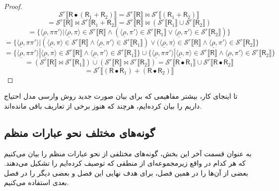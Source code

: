 \begin{proof}
	$$\mathcal{S}^r \llbracket \mathsf{R}\bullet (\mathsf{R}_1 + \mathsf{R}_2) \rrbracket =\mathcal{S}^r \llbracket \mathsf{R} \rrbracket \Join \mathcal{S}^r \llbracket (\mathsf{R}_1+\mathsf{R}_2) \rrbracket$$
	$$=\mathcal{S}^r \llbracket \mathsf{R} \rrbracket \Join \mathcal{S}^r \llbracket \mathsf{R}_1+\mathsf{R}_2 \rrbracket=\mathcal{S}^r \llbracket \mathsf{R} \rrbracket \Join (\mathcal{S}^r \llbracket \mathsf{R}_1 \rrbracket \cup \mathcal{S}^r\llbracket \mathsf{R}_2 \rrbracket)$$
	$$= \{ \langle \underline{\rho}, \pi \pi' \rangle| \langle \underline{\rho}, \pi \rangle \in \mathcal{S}^r \llbracket \mathsf{R} \rrbracket \land (\langle \underline{\rho},\pi'\rangle \in \mathcal{S}^r \llbracket \mathsf{R}_1 \rrbracket\lor \langle \underline{\rho} , \pi' \rangle \in \mathcal{S}^r \llbracket \mathsf{R}_2 \rrbracket) \}$$
	$$=\{ \langle \underline{\rho}, \pi \pi' \rangle| (\langle \underline{\rho}, \pi \rangle \in \mathcal{S}^r \llbracket \mathsf{R} \rrbracket \land \langle \underline{\rho},\pi'\rangle \in \mathcal{S}^r \llbracket \mathsf{R}_1 \rrbracket) \lor (\langle \underline{\rho}, \pi \rangle \in \mathcal{S}^r \llbracket \mathsf{R} \rrbracket \land \langle \underline{\rho} , \pi' \rangle \in \mathcal{S}^r \llbracket \mathsf{R}_2 \rrbracket  \}$$
	$$=\{ \langle \underline{\rho}, \pi \pi' \rangle|\langle \underline{\rho}, \pi \rangle \in \mathcal{S}^r \llbracket \mathsf{R} \rrbracket \land \langle \underline{\rho},\pi'\rangle \in \mathcal{S}^r \llbracket \mathsf{R}_1 \rrbracket\} \cup
	\{ \langle \underline{\rho}, \pi \pi' \rangle|\langle \underline{\rho}, \pi \rangle \in \mathcal{S}^r \llbracket \mathsf{R} \rrbracket \land \langle \underline{\rho},\pi'\rangle \in \mathcal{S}^r \llbracket \mathsf{R}_2 \rrbracket\}$$
	$$=(\mathcal{S}^r \llbracket \mathsf{R} \rrbracket \Join \mathcal{S}^r \llbracket \mathsf{R}_1\rrbracket ) \cup (\mathcal{S}^r \llbracket \mathsf{R} \rrbracket \Join \mathcal{S}^r \llbracket \mathsf{R}_2 \rrbracket)=
	\mathcal{S}^r \llbracket \mathsf{R\bullet R}_1 \rrbracket \cup \mathcal{S}^r \llbracket \mathsf{R\bullet R}_2 \rrbracket$$
	$$=\mathcal{S}^r \llbracket (\mathsf{R \bullet R}_1) + (\mathsf{R \bullet R}_2) \rrbracket $$
\end{proof}
تا اینجای کار، بیشتر مفاهیمی که برای بیان صورت جدید روش وارسی مدل احتیاج داریم را بیان کرده‌ایم، هرچند که هنوز برخی از تعاریف باقی مانده‌اند.
\subsection{گونه‌های مختلف نحو عبارات منظم}
به عنوان قسمت آخر این بخش، گونه‌های مختلفی از نحو عبارات منظم را بیان می‌کنیم که هر کدام در واقع زیرمجموعه‌ای از منطقی که توصیف کرده‌ایم را تشکیل می‌دهند. بعضی از آن‌ها را در همین فصل، برای هدف نهایی این فصل و بعضی دیگر را در فصل بعدی استفاده می‌کنیم.

